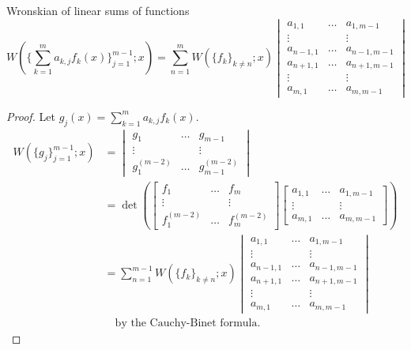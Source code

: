 \documentclass{book}
\begin{document}
\begin{lemma}{Wronskian of linear sums of functions}
\begin{equation*}
W( \{ \sum_{k=1}^m a_{k,j} f_k(x) \}_{j=1}^{m-1} ; x) = \sum_{n=1}^m W(\{f_k\}_{k\neq n} ; x) \begin{vmatrix}
a_{1,1} & \dots & a_{1,m-1} \\
\vdots & & \vdots \\
a_{n-1,1} & \dots & a_{n-1,m-1} \\
a_{n+1,1} & \dots & a_{n+1,m-1} \\
\vdots & & \vdots \\
a_{m,1} & \dots & a_{m,m-1}
\end{vmatrix}
\end{equation*}
\label{lem:sum}
\end{lemma}

\begin{proof}
Let $g_j(x) = \sum_{k=1}^m a_{k,j} f_k(x)$.
\begin{align*}
W(\{g_j\}_{j=1}^{m-1} ; x) & = \begin{vmatrix}
g_1 & \dots & g_{m-1} \\
\vdots & & \vdots \\
g_1^{(m-2)} & \dots & g_{m-1}^{(m-2)} \end{vmatrix} \\
& = \det \left ( \begin{bmatrix} f_1 & \dots & f_m \\ \vdots & & \vdots \\ f_1^{(m-2)} & \dots & f_m^{(m-2)} \end{bmatrix} \begin{bmatrix} a_{1,1} & \dots & a_{1,m-1} \\ \vdots & & \vdots \\ a_{m,1} & \dots & a_{m,m-1} \end{bmatrix} \right ) \\
& = \sum_{n=1}^{m-1} W(\{f_k\}_{k\neq n} ; x) \begin{vmatrix}
a_{1,1} & \dots & a_{1,m-1} \\
\vdots & & \vdots \\
a_{n-1,1} & \dots & a_{n-1,m-1} \\
a_{n+1,1} & \dots & a_{n+1,m-1} \\
\vdots & & \vdots \\
a_{m,1} & \dots & a_{m,m-1}
\end{vmatrix} \\
& \quad \text{by the Cauchy-Binet formula.}
\end{align*}
\end{proof}
\end{document}
